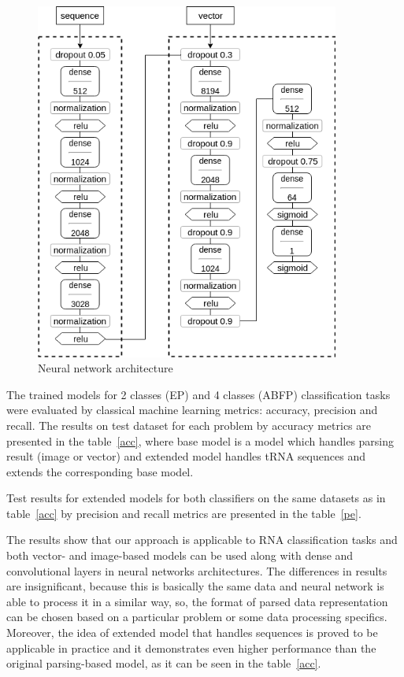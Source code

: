 \documentclass[12pt,a4paper]{cibb}
\begin{document}
\begin{figure}[h]
\begin{center}
\centering
\includegraphics[width=10cm]{nn.png}
\caption{Neural network architecture}
\label{nn}
\end{center}
\end{figure}   

The trained models for 2 classes (EP) and 4 classes (ABFP) classification tasks were evaluated by classical machine learning metrics: accuracy, precision and recall. The results on test dataset for each problem by accuracy metrics are presented in the table~\ref{acc}, where base model is a model which handles parsing result (image or vector) and extended model handles tRNA sequences and extends the corresponding base model.


Test results for extended models for both classifiers on the same datasets as in table~\ref{acc} by precision and recall metrics  are presented in the table~\ref{pe}.




The results show that our approach is applicable to RNA classification tasks and both vector- and image-based models can be used along with dense and convolutional layers in neural networks architectures. The differences in results are insignificant, because this is basically the same data and neural network is able to process it in a similar way, so, the format of parsed data representation can be chosen based on a particular problem or some data processing specifics. Moreover, the idea of extended model that handles sequences is proved to be applicable in practice and it demonstrates even higher performance than the original parsing-based model, as it can be seen in the table~\ref{acc}.
\end{document}
